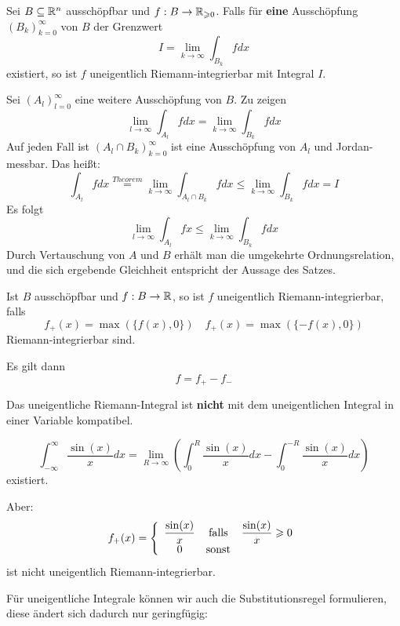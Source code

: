 \documentclass[main.tex]{subfiles}
\begin{document}
\begin{Theorem}
  Sei $B \subseteq \R^n$ ausschöpfbar und $f: B \to \R_{\geq 0}$. Falls für \textbf{eine} Ausschöpfung $(B_k)_{k=0}^\infty$ von $B$ der Grenzwert
  $$I = \lim \limits_{k \to \infty} \int_{B_k} f dx$$
  existiert, so ist $f$ uneigentlich Riemann-integrierbar mit Integral $I$.
\end{Theorem}
\begin{Beweis}
  Sei $(A_l)_{l = 0}^\infty$ eine weitere Ausschöpfung von $B$. Zu zeigen
  $$\lim \limits_{l \to \infty} \int_{A_l} f dx = \lim \limits_{k \to \infty} \int_{B_k} f dx$$
  Auf jeden Fall ist $(A_l \cap B_k)_{k = 0}^\infty$ ist eine Ausschöpfung von $A_l$ und Jordan-messbar. Das heißt:
  $$\int_{A_l} f dx \stackrel{\scriptscriptstyle Theorem}{=} \lim \limits_{k \to \infty} \int_{A_l \cap B_k} fdx \leq \lim \limits_{k \to \infty} \int_{B_k} fdx = I$$
  Es folgt
  $$\lim \limits_{l \to \infty} \int_{A_l} fx \leq  \lim \limits_{k \to \infty} \int_{B_k} fdx$$
  Durch Vertauschung von $A$ und $B$ erhält man die umgekehrte Ordnungsrelation, und die sich ergebende Gleichheit entspricht der Aussage des Satzes.
\end{Beweis}

\begin{Bemerkung}
  Ist $B$ ausschöpfbar und $f: B \to \R$, so ist $f$ uneigentlich Riemann-integrierbar, falls
  $$f_+(x) = \max(\{f(x),0\}) \quad f_+(x) = \max(\{-f(x),0\})$$
  Riemann-integrierbar sind.

  Es gilt dann
  $$f = f_+ - f_-$$
\end{Bemerkung}
\begin{Bemerkung}[Warnung]
  Das uneigentliche Riemann-Integral ist \textbf{nicht} mit dem uneigentlichen Integral in einer Variable kompatibel.
  \begin{Beispiel}
    $$\int_{-\infty}^\infty \dfrac{\sin(x)}{x} dx = \lim \limits_{R \to \infty} \left( \int_0^R  \dfrac{\sin(x)}{x} dx - \int_0^{-R}  \dfrac{\sin(x)}{x} dx\right)$$
    existiert.

    Aber:
    $$f_+(x) = \left\{\begin{array}{c c c}
      \dfrac{\sin(x)}{x} & \text{falls} & \dfrac{\sin(x)}{x} \geq 0 \\
      0 & \text{sonst} &
    \end{array}\right.$$
    ist nicht uneigentlich Riemann-integrierbar.
  \end{Beispiel}
\end{Bemerkung}

Für uneigentliche Integrale können wir auch die Substitutionsregel formulieren, diese ändert sich dadurch nur geringfügig:
\end{document}
